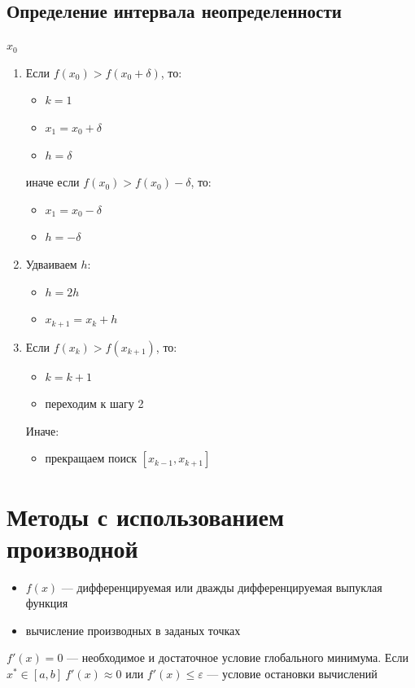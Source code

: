 \documentclass[oneside]{book}
\theoremstyle{plain}
\theoremstyle{remark}
\theoremstyle{definition}
\begin{document}
\subsection{Определение интервала неопределенности}
\label{sec:org7e95d6c}
\(x_0\)
\begin{enumerate}
\item Если \(f(x_0) > f(x_0 + \delta)\), то:
\begin{itemize}
\item \(k = 1\)
\item \(x_1 = x_0 + \delta\)
\item \(h = \delta\)
\end{itemize}
иначе если \(f(x_0) > f(x_0) - \delta\), то:
\begin{itemize}
\item \(x_1 = x_0 - \delta\)
\item \(h = -\delta\)
\end{itemize}
\item Удваиваем \(h\):
\begin{itemize}
\item \(h = 2h\)
\item \(x_{k + 1} = x_k + h\)
\end{itemize}
\item Если \(f(x_k) > f(x_{k + 1})\), то:
\begin{itemize}
\item \(k = k + 1\)
\item переходим к шагу 2
\end{itemize}
Иначе:
\begin{itemize}
\item прекращаем поиск \([x_{k - 1}, x_{k + 1}]\)
\end{itemize}
\end{enumerate}
\section{Методы с использованием производной}
\label{sec:orgbe7fd8b}

\begin{itemize}
\item \(f(x)\) --- дифференцируемая или дважды дифференцируемая выпуклая функция
\item вычисление производных в заданых точках
\end{itemize}

\(f'(x) = 0\) --- необходимое и достаточное условие глобального
минимума.  Если \(x^* \in [a, b]\ f'(x) \approx 0\) или \(f'(x) \le
\varepsilon\) --- условие остановки вычислений
\end{document}
